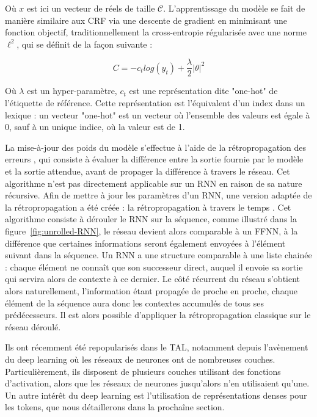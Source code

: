 \documentclass[12pt,a4paper,times,twoside,openright]{report}
\begin{document}
Où $x$ est ici un vecteur de réels de taille $\mathcal{C}$. L'apprentissage du modèle se fait de manière similaire aux CRF via une descente de gradient en minimisant une fonction objectif, traditionnellement la cross-entropie régularisée avec une norme $\ell^{2}$, qui se définit de la façon suivante :

\begin{equation} \label{eq:cross-entropy}
C = - c_{t} log( y_{t} ) + \frac{\lambda}{2} \left | \theta \right |^{2}
\end{equation}

Où $\lambda$ est un hyper-paramètre, $c_{t}$ est une représentation dite "one-hot" de l'étiquette de référence. Cette représentation est l'équivalent d'un index dans un lexique : un vecteur "one-hot" est un vecteur où l'ensemble des valeurs est égale à 0, sauf à un unique indice, où la valeur est de 1.

La mise-à-jour des poids du modèle s'effectue à l'aide de la rétropropagation des erreurs \citep{linnainmaa1970representation,werbos1982applications,rumelhart1985learning}, qui consiste à évaluer la différence entre la sortie fournie par le modèle et la sortie attendue, avant de propager la différence à travers le réseau. Cet algorithme n'est pas directement applicable sur un RNN en raison de sa nature récursive. Afin de mettre à jour les paramètres d'un RNN, une version adaptée de la rétropropagation a été créée : la rétropropagation à travers le temps \citep{werbos1990backpropagation}. Cet algorithme consiste à dérouler le RNN sur la séquence, comme illustré dans la figure\ \ref{fig:unrolled-RNN}, le réseau devient alors comparable à un FFNN, à la différence que certaines informations seront également envoyées à l'élément suivant dans la séquence. Un RNN a une structure comparable à une liste chainée : chaque élément ne connaît que son successeur direct, auquel il envoie sa sortie qui servira alors de contexte à ce dernier. Le côté récurrent du réseau s'obtient alors naturellement, l'information étant propagée de proche en proche, chaque élément de la séquence aura donc les contextes accumulés de tous ses prédécesseurs. Il est alors possible d'appliquer la rétropropagation classique sur le réseau déroulé.

Ils ont récemment été repopularisés dans le TAL, notamment depuis l'avènement du deep learning \citep{hinton2007learning,goodfellow2016deep} où les réseaux de neurones ont de nombreuses couches. Particulièrement, ils disposent de plusieurs couches utilisant des fonctions d'activation, alors que les réseaux de neurones jusqu'alors n'en utilisaient qu'une. Un autre intérêt du deep learning est l'utilisation de représentations denses pour les tokens, que nous détaillerons dans la prochaîne section.
\end{document}
